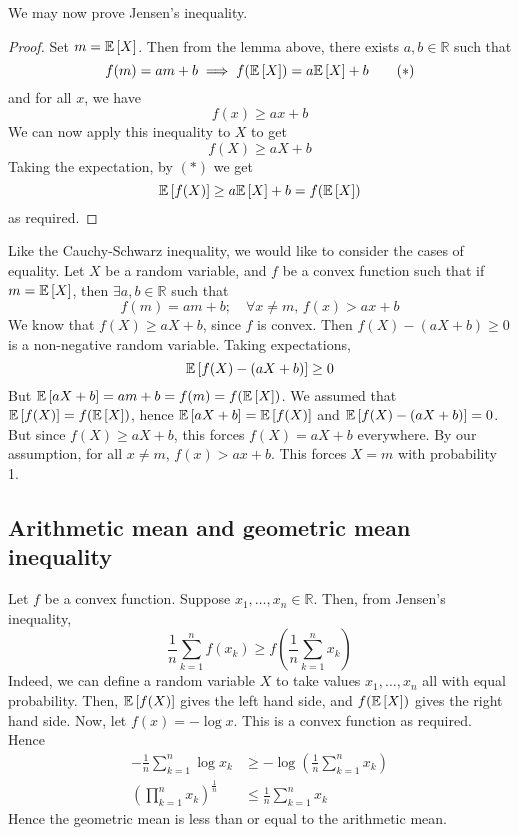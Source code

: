 \noindent We may now prove Jensen's inequality.
\begin{proof}
	Set \(m = \mathbb{E}\left[{X}\right]\).
	Then from the lemma above, there exists \(a, b \in \mathbb R\) such that
	\begin{equation}
		f(m) = am + b \implies f(\mathbb{E}\left[{X}\right]) = a\mathbb{E}\left[{X}\right] + b \tag{\(\ast\)}
	\end{equation}
	and for all \(x\), we have
	\[
		f(x) \geq ax + b
	\]
	We can now apply this inequality to \(X\) to get
	\[
		f(X) \geq aX + b
	\]
	Taking the expectation, by \((\ast)\) we get
	\[
		\mathbb{E}\left[{f(X)}\right] \geq a\mathbb{E}\left[{X}\right] + b = f(\mathbb{E}\left[{X}\right])
	\]
	as required.
\end{proof}
\noindent Like the Cauchy-Schwarz inequality, we would like to consider the cases of equality.
Let \(X\) be a random variable, and \(f\) be a convex function such that if \(m = \mathbb{E}\left[{X}\right]\), then \(\exists a, b \in \mathbb R\) such that
\[
	f(m) = am + b;\quad \forall x \neq m,\, f(x) > ax + b
\]
We know that \(f(X) \geq aX + b\), since \(f\) is convex.
Then \(f(X) - (aX+b) \geq 0\) is a non-negative random variable.
Taking expectations,
\[
	\mathbb{E}\left[{f(X) - (aX+b)}\right] \geq 0
\]
But \(\mathbb{E}\left[{aX + b}\right] = am + b = f(m) = f(\mathbb{E}\left[{X}\right])\).
We assumed that \(\mathbb{E}\left[{f(X)}\right] = f(\mathbb{E}\left[{X}\right])\), hence \(\mathbb{E}\left[{aX+b}\right] = \mathbb{E}\left[{f(X)}\right]\) and \(\mathbb{E}\left[{f(X) - (aX+b)}\right] = 0\).
But since \(f(X) \geq aX+b\), this forces \(f(X) = aX+b\) everywhere.
By our assumption, for all \(x \neq m\), \(f(x) > ax+b\).
This forces \(X=m\) with probability 1.

\subsection{Arithmetic mean and geometric mean inequality}
Let \(f\) be a convex function.
Suppose \(x_1, \dots, x_n \in \mathbb R\).
Then, from Jensen's inequality,
\[
	\frac{1}{n} \sum_{k=1}^n f(x_k) \geq f\left( \frac{1}{n} \sum_{k=1}^n x_k \right)
\]
Indeed, we can define a random variable \(X\) to take values \(x_1, \dots, x_n\) all with equal probability.
Then, \(\mathbb{E}\left[{f(X)}\right]\) gives the left hand side, and \(f(\mathbb{E}\left[{X}\right])\) gives the right hand side.
Now, let \(f(x) = -\log x\).
This is a convex function as required.
Hence
\begin{align*}
	-\frac{1}{n} \sum_{k=1}^n \log x_k             & \geq -\log\left( \frac{1}{n} \sum_{k=1}^n x_k \right) \\
	\left( \prod_{k=1}^n x_k \right)^{\frac{1}{n}} & \leq \frac{1}{n} \sum_{k=1}^n x_k
\end{align*}
Hence the geometric mean is less than or equal to the arithmetic mean.
